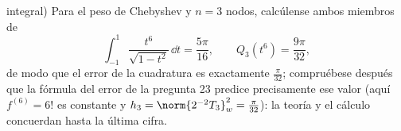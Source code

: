 \begin{problem}
\begin{enumerate}[resume]
        integral) Para el peso de Chebyshev y $n = 3$ nodos, calcúlense
        ambos miembros de
        \[
        \int_{-1}^{1}\frac{t^6}{\sqrt{1 - t^2}}\,\dd t
        = \frac{5\pi}{16},
        \qquad
        Q_3(t^6) = \frac{9\pi}{32},
        \]
        de modo que el error de la cuadratura es exactamente
        $\frac{\pi}{32}$; compruébese después que la fórmula del error
        de la pregunta 23 predice precisamente ese valor (aquí
        $f^{(6)} = 6!$ es constante y $h_3 = \norm{2^{-2}T_3}_w^2 =
        \frac\pi{32}$): la teoría y el cálculo concuerdan hasta la
        última cifra.
\end{enumerate}
\end{problem}

